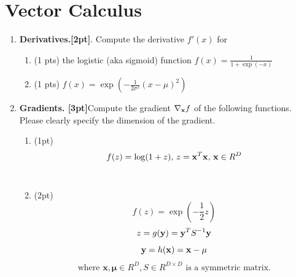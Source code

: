 \documentclass{article}
\def\x{{\bf x}}
\def\y{{\bf y}}
\begin{document}
\section*{Vector Calculus}
\begin{enumerate}
    \item \textbf{Derivatives.[2pt]}. Compute the derivative $f'(x)$ for 
    \begin{enumerate}
        \item (1 pts) the logistic (aka sigmoid) function $f(x) = \frac{1}{1+\exp(-x)}$
        \\
        \item (1 pts) $f(x) = \exp(-\frac{1}{2\sigma^2}(x-\mu)^2)$\\
    \end{enumerate}
    \item \textbf{Gradients. [3pt]}Compute the gradient $\nabla_{\x}f$ of the following functions. Please clearly specify the dimension of the gradient. 
\begin{enumerate}
    \item (1pt) \[f(z)=\log(1+z)\mbox{,  }  z= \x^T\x\mbox{,  } \x\in R^D\] \\

    \item (2pt)  \[f(z) = \exp{(-\frac{1}{2}z)} \]
    \[ z=g(\y)=\y^T S^{-1}\y \]
    \[ \y=h(\x)= \x-\mathbf{\mu} \]
    \[\mbox{where } \mathbf{x}, \mathbf{\mu} \in R^D, S\in R^{D\times D} \mbox{ is a symmetric matrix.}\] 
    \\
\end{enumerate}    


\end{enumerate}
\end{document}
